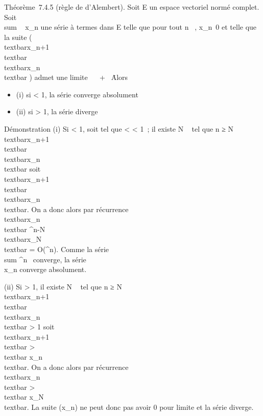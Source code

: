 \documentclass[]{article}
\begin{document}
Théorème~7.4.5 (règle de d'Alembert). Soit E un espace vectoriel normé
complet. Soit \\sum ~
x\_n une série à termes dans E telle que pour tout n \in {}~,
x\_n\neq~0 et telle que la suite (
\\textbar{}x\_n+1\\textbar{}
\over
\\textbar{}x\_n\\textbar{} )
admet une limite \ell \in {}~ \cup\ + \infty~\. Alors

\begin{itemize}
\itemsep1pt\parskip0pt
\item
  (i) si \ell \textless{} 1, la série converge absolument
\item
  (ii) si \ell \textgreater{} 1, la série diverge
\end{itemize}

Démonstration (i) Si \ell \textless{} 1, soit \rho tel que \ell \textless{} \rho
\textless{} 1~; il existe N \in {}~ tel que n ≥ N \rigtharrow~
\\textbar{}x\_n+1\\textbar{}
\over
\\textbar{}x\_n\\textbar{} \leq \rho
soit \\textbar{}x\_n+1\\textbar{}
\leq \rho\\textbar{}x\_n\\textbar{}. On
a donc alors par récurrence
\\textbar{}x\_n\\textbar{} \leq
\rho^n-N\\textbar{}x\_N\\textbar{}
= O(\rho^n). Comme la série
\\sum  \rho^n~
converge, la série \\\sum
 x\_n converge absolument.

(ii) Si \ell \textgreater{} 1, il existe N \in {}~ tel que n ≥ N \rigtharrow~
\\textbar{}x\_n+1\\textbar{}
\over
\\textbar{}x\_n\\textbar{}
\textgreater{} 1 soit
\\textbar{}x\_n+1\\textbar{}
\textgreater{}\\textbar{}
x\_n\\textbar{}. On a donc alors par récurrence
\\textbar{}x\_n\\textbar{}
\textgreater{}\\textbar{}
x\_N\\textbar{}. La suite (x\_n) ne peut
donc pas avoir 0 pour limite et la série diverge.
\end{document}
